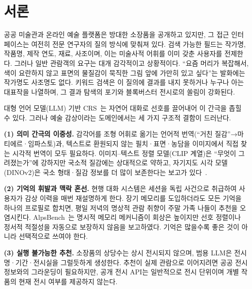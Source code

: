 \documentclass[10pt,twocolumn,letterpaper]{article}
\begin{document}
\section{서론}

공공 미술관과 온라인 예술 플랫폼은 방대한 소장품을 공개하고 있지만, 그 접근 인터페이스는 여전히 전문 연구자의 질의 방식에 맞춰져 있다. 검색 가능한 필드는 작가명, 작품명, 제작 연도, 재료, 사조이며, 이는 미술사적 어휘를 이미 갖춘 사용자를 전제한다. 그러나 일반 관람객의 요구는 대개 감각적이고 상황적이다. ``요즘 머리가 복잡해서, 색이 요란하지 않고 표면의 물질감이 묵직한 그림 앞에 가만히 있고 싶다''는 발화에는 작가명도 사조명도 없다. 키워드 검색은 이 질의에 결과를 내지 못하거나 누구나 아는 대표작을 나열하며, 그 결과 탐색의 포기와 블록버스터 전시로의 쏠림이 강화된다.

대형 언어 모델(LLM) 기반 CRS~\cite{friedman2023recllm,jannach2021survey}는 자연어 대화로 선호를 끌어내어 이 간극을 좁힐 수 있다. 그러나 예술 감상이라는 도메인에서는 세 가지 구조적 결함이 드러난다.

\textbf{(1) 의미 간극의 이중성.} 감각어를 조형 어휘로 옮기는 언어적 번역(``거친 질감''→마티에르·임파스토)과, 텍스트로 환원되지 않는 필치·표면·농담을 이미지에서 직접 찾는 시각적 번역이 모두 필요하다. 이미지–텍스트 정렬 모델(CLIP 계열)은 ``무엇이 그려졌는가''에 강하지만 국소적 질감에는 상대적으로 약하고, 자기지도 시각 모델(DINOv2)은 국소 형태·질감 정보를 더 많이 보존한다는 보고가 있다~\cite{jiang2023clip2dino}.

\textbf{(2) 기억의 휘발과 맥락 혼선.} 현행 대화 시스템은 세션을 독립 사건으로 취급하여 사용자가 감상 이력을 매번 재설명하게 한다. 장기 메모리를 도입하더라도 모든 기억을 하나의 프로필로 합치면, 평일 저녁의 명상적 관람 취향이 주말 가족 나들이 추천을 오염시킨다. AlpsBench~\cite{xiao2026alpsbench}는 명시적 메모리 메커니즘이 회상은 높이지만 선호 정렬이나 정서적 적절성을 자동으로 보장하지 않음을 보고하였다. 기억은 많을수록 좋은 것이 아니라 선택적으로 쓰여야 한다.

\textbf{(3) 실행 불가능한 추천.} 소장품의 상당수는 상시 전시되지 않으며, 범용 LLM은 전시명·기간·전시실을 그럴듯하게 생성한다. 추천이 실제 관람으로 이어지려면 공공 전시 정보와의 그라운딩이 필요하지만, 공개 전시 API는 일반적으로 전시 단위이며 개별 작품의 현재 전시 여부를 제공하지 않는다.
\end{document}
